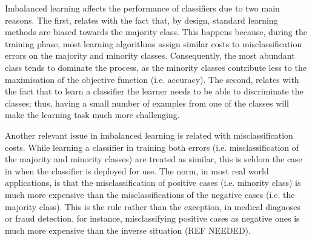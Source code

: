 \documentclass[parskip=full]{scrartcl}
\begin{document}
Imbalanced learning affects the performance of classifiers due to two main reasons. The first, relates with the fact that, by design, standard learning methods are biased towards the majority class. This happens because, during the training phase, most learning algorithms assign similar costs to misclassification errors on the majority and minority classes. Consequently, the most abundant class tends to dominate the process, as the minority classes contribute less to the maximisation of the objective function (i.e. accuracy). The second, relates with the fact that to learn a classifier the learner needs to be able to discriminate the classes; thus, having a small number of examples from one of the classes will make the learning task much more challenging.

Another relevant issue in imbalanced learning is related with misclassification costs. While learning a classifier in training both errors (i.e. misclassification of the majority and minority classes) are treated as similar, this is seldom the case in when the classifier is  deployed for use. The norm, in most real world applications, is that the misclassification of positive cases (i.e. minority class) is much more expensive than the misclassifications of the negative cases (i.e. the majority class). This is the rule rather than the exception, in medical diagnoses or fraud detection, for instance, misclassifying positive cases as negative ones is much more expensive than the inverse situation (REF NEEDED).
\end{document}
